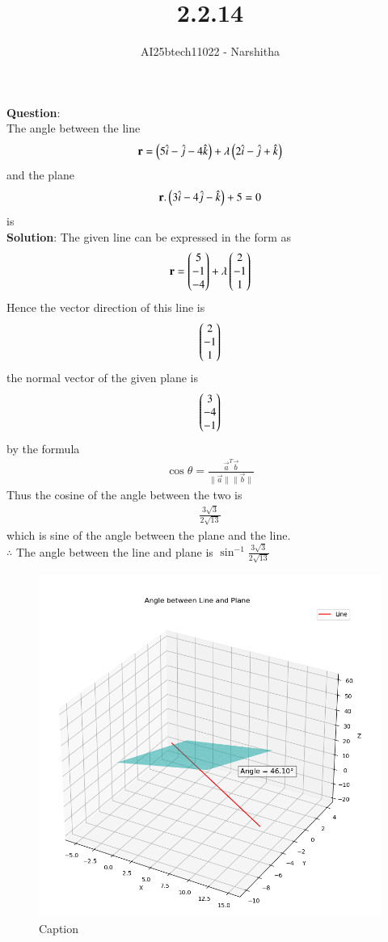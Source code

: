 \documentclass[journal,12pt,onecolumn]{IEEEtran}
\theoremstyle{remark}
\begin{document}
\title{2.2.14}
\author{AI25btech11022 - Narshitha}
\maketitle
\renewcommand{\thefigure}{\theenumi}
\renewcommand{\thetable}{\theenumi}
\textbf{Question}:\\
The angle between the line \\
\begin{align}
\mathbf{r}=\left(5\hat{i}-\hat{j}-4\hat{k}\right)+\lambda\left(2\hat{i}-\hat{j}+\hat{k}\right)
\end{align}
and the plane 
\begin{align}
   \mathbf{r}.\left(3\hat{i}-4\hat{j}-\hat{k}\right)+5=0
\end{align}
is\\
\textbf{Solution}:
The given line can be expressed in the form as \\
\begin{align}
    \mathbf{r}=\begin{pmatrix}5\\-1\\-4\end{pmatrix}+\lambda\begin{pmatrix}2\\-1\\1\end{pmatrix}
\end{align}
Hence the vector direction of this line is
\begin{align}
    \begin{pmatrix}2\\-1\\1\end{pmatrix}
\end{align}
the normal vector of the given plane is
\begin{align}
    \begin{pmatrix}3\\-4\\-1\end{pmatrix}
\end{align}
by the formula
\begin{align}
    \cos\theta=\frac{\vec{a}^T\vec{b}}{\|\vec{a}\|\|\vec{b}\|}
\end{align}
Thus the cosine of the angle between the two is
\begin{align}
\frac{3\sqrt{3}}{2\sqrt{13}}
\end{align}
which is sine of the angle between the plane and the line.\\
$\therefore$ The angle between the line and plane is $\sin^{-1}\frac{3\sqrt{3}}{2\sqrt{13}}$
\begin{figure}
    \centering
    \includegraphics[width=0.5\linewidth]{figs/fig1.png}
    \caption{Caption}
    \label{fig:placeholder}
\end{figure}
\end{document}
